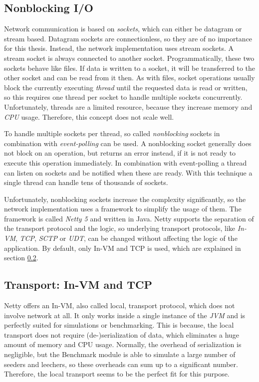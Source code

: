 \subsection{Nonblocking I/O}
Network communication is based on \emph{sockets}, which can either be datagram or stream based. Datagram sockets are connectionless, so they are of no importance for this thesis. Instead, the network implementation uses stream sockets. A stream socket is always connected to another socket. Programmatically, these two sockets behave like files. If data is written to a socket, it will be transferred to the other socket and can be read from it then. As with files, socket operations usually block the currently executing \emph{thread} until the requested data is read or written, so this requires one thread per socket to handle multiple sockets concurrently. Unfortunately, threads are a limited resource, because they increase memory and \emph{CPU} usage. Therefore, this concept does not scale well.

To handle multiple sockets per thread, so called \emph{nonblocking} sockets in combination with \emph{event-polling} can be used. A nonblocking socket generally does not block on an operation, but returns an error instead, if it is not ready to execute this operation immediately. In combination with event-polling a thread can listen on sockets and be notified when these are ready. With this technique a single thread can handle tens of thousands of sockets.

Unfortunately, nonblocking sockets increase the complexity significantly, so the network implementation uses a framework to simplify the usage of them. The framework is called \emph{Netty 5} and written in Java. Netty supports the separation of the transport protocol and the logic, so underlying transport protocols, like \emph{In-VM}, \emph{TCP}, \emph{SCTP} or \emph{UDT}, can be changed without affecting the logic of the application. By default, only In-VM and TCP is used, which are explained in section \ref{subsec:transport}.

\subsection{Transport: In-VM and TCP}
\label{subsec:transport}
Netty offers an In-VM, also called local, transport protocol, which does not involve network at all. It only works inside a single instance of the \emph{JVM} and is perfectly suited for simulations or benchmarking. This is because, the local transport does not require (de-)serialization of data, which eliminates a huge amount of memory and CPU usage. Normally, the overhead of serialization is negligible, but the Benchmark module is able to simulate a large number of seeders and leechers, so these overheads can sum up to a significant number. Therefore, the local transport seems to be the perfect fit for this purpose.

